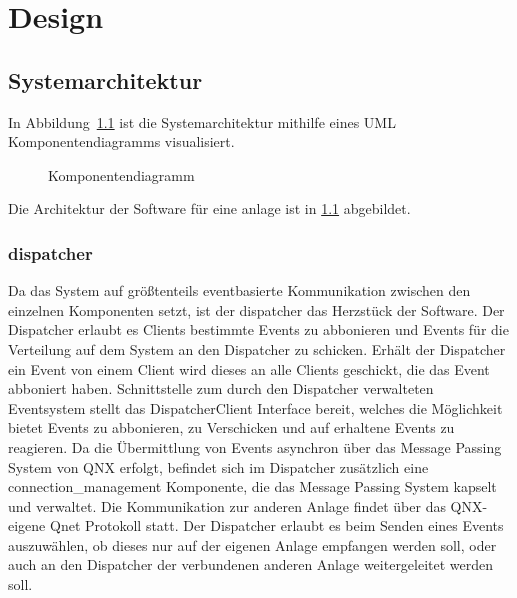 \chapter{Design}\label{ch:design}



\section{Systemarchitektur}\label{sec:systemarchitektur}


In Abbildung~\ref{fig:cmp} ist die Systemarchitektur mithilfe eines UML Komponentendiagramms
visualisiert.

\begin{figure}[h]
    \centering
    \caption{Komponentendiagramm}
    \label{fig:cmp}
\end{figure}

Die Architektur der Software für eine \gls{anlage} ist in \ref{fig:cmp} abgebildet.

\subsection{dispatcher}\label{subsec:dispatcher}
Da das System auf größtenteils eventbasierte Kommunikation zwischen den einzelnen Komponenten setzt,
ist der dispatcher das Herzstück der Software. Der Dispatcher erlaubt es Clients bestimmte Events zu abbonieren
und Events für die Verteilung auf dem System an den Dispatcher zu schicken. Erhält der Dispatcher ein Event von einem 
Client wird dieses an alle Clients geschickt, die das Event abboniert haben. Schnittstelle zum durch den Dispatcher 
verwalteten Eventsystem stellt das DispatcherClient Interface bereit, welches die Möglichkeit bietet Events zu abbonieren,
zu Verschicken und auf erhaltene Events zu reagieren. Da die Übermittlung von Events asynchron über das Message Passing System
von QNX erfolgt, befindet sich im Dispatcher zusätzlich eine connection\_management Komponente, die das Message Passing System 
kapselt und verwaltet. Die Kommunikation zur anderen Anlage findet über das QNX-eigene Qnet Protokoll statt. 
Der Dispatcher erlaubt es beim Senden eines Events auszuwählen, ob dieses nur auf der eigenen Anlage empfangen werden soll,
oder auch an den Dispatcher der verbundenen anderen Anlage weitergeleitet werden soll.

